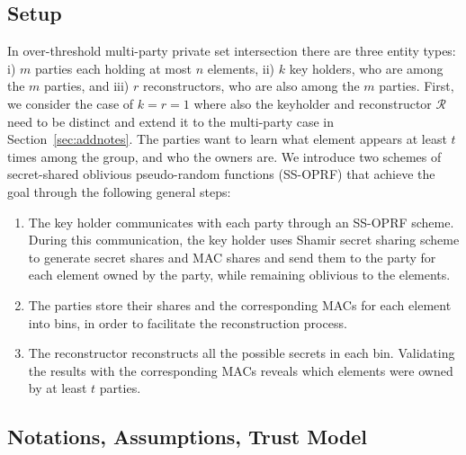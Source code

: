\subsection{Setup}
In over-threshold multi-party private set intersection there are three entity types: i) $m$ parties each holding at most $n$ elements, ii) $k$ key holders, who are among the $m$ parties, and iii) $r$ reconstructors, who are also among the $m$ parties. First, we consider the case of $k = r = 1$ where also the keyholder and reconstructor $\mathcal{R}$ need to be distinct and extend it to the multi-party case in Section~\ref{sec:addnotes}. The parties want to learn what element appears at least $t$ times among the group, and who the owners are. We introduce two schemes of secret-shared oblivious pseudo-random functions (SS-OPRF) that achieve the goal through the following general steps:
\begin{enumerate}[label=(\alph*)]
    \item The key holder communicates with each party through an SS-OPRF scheme. During this communication, the key holder uses Shamir secret sharing scheme \cite{Shamir} to generate secret shares and MAC shares and send them to the party for each element owned by the party, while remaining oblivious to the elements. 
    \item The parties store their shares and the corresponding MACs for each element into bins, in order to facilitate the reconstruction process. 
    \item The reconstructor reconstructs all the possible secrets in each bin. Validating the results with the corresponding MACs reveals which elements were owned by at least $t$ parties. 
\end{enumerate}

\subsection{Notations, Assumptions, Trust Model}
